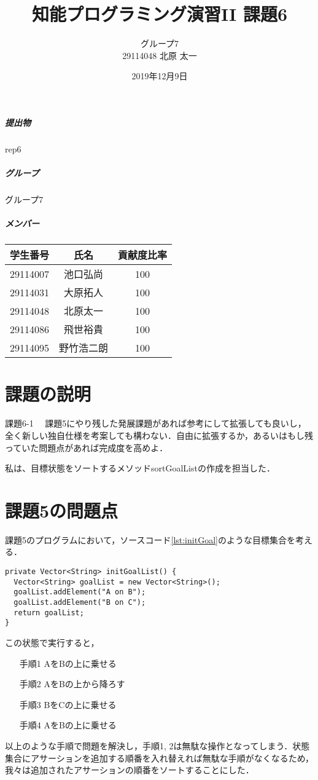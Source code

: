 \documentclass{jarticle}
\title{知能プログラミング演習II 課題6}
\author{グループ7\\
  29114048 北原 太一\\
}
\date{2019年12月9日}
\begin{document}
\maketitle

\subparagraph{提出物} rep6
\subparagraph{グループ} グループ7
\subparagraph{メンバー}
\begin{tabular}{|c|c|c|}
  \hline
  学生番号&氏名&貢献度比率\\
  \hline\hline
  29114007&池口弘尚&100\\
  \hline
  29114031&大原拓人&100\\
  \hline
  29114048&北原太一&100\\
  \hline
  29114086&飛世裕貴&100\\
  \hline
  29114095&野竹浩二朗&100\\
  \hline
\end{tabular}

\section{課題の説明}
\begin{itembox}{課題6-1}
　課題5にやり残した発展課題があれば参考にして拡張しても良いし，全く新しい独自仕様を考案しても構わない．自由に拡張するか，あるいはもし残っていた問題点があれば完成度を高めよ．
\end{itembox}

私は、目標状態をソートするメソッドsortGoalListの作成を担当した．
\section{課題5の問題点}
課題5のプログラムにおいて，ソースコード\ref{lst:initGoal}のような目標集合を考える．
\newpage
  \begin{lstlisting}[caption=Planner.java(一部抜粋),label=lst:initGoal]
private Vector<String> initGoalList() {
  Vector<String> goalList = new Vector<String>();
  goalList.addElement("A on B");
  goalList.addElement("B on C");
  return goalList;
}
  \end{lstlisting}
 
この状態で実行すると，
\begin{enumerate}
\item[手順1] AをBの上に乗せる
\item[手順2] AをBの上から降ろす
\item[手順3] BをCの上に乗せる
\item[手順4] AをBの上に乗せる
\end{enumerate}
以上のような手順で問題を解決し，手順1, 2は無駄な操作となってしまう．状態集合にアサーションを追加する順番を入れ替えれば無駄な手順がなくなるため，我々は追加されたアサーションの順番をソートすることにした．
\end{document}
